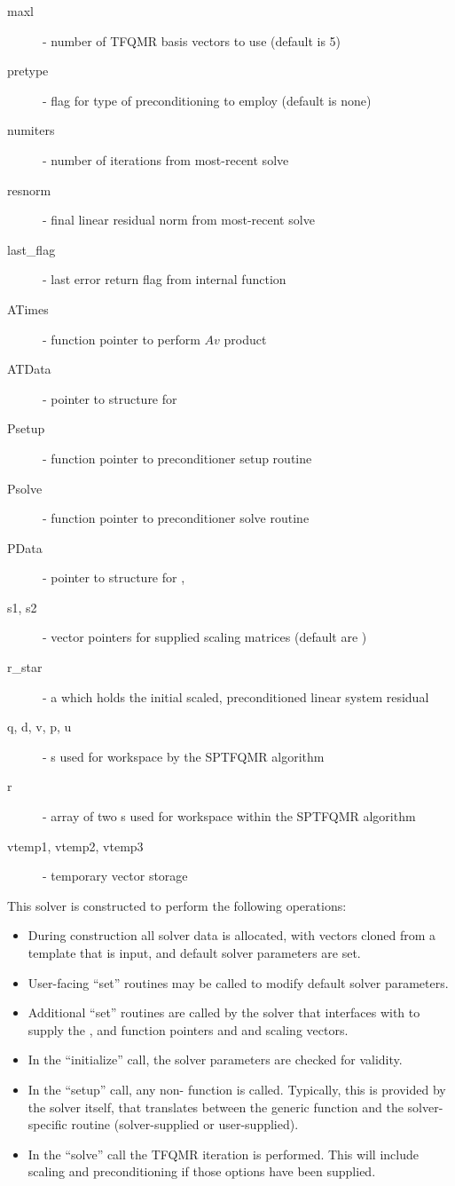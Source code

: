 \begin{description}
  \item[maxl] - number of TFQMR basis vectors to use (default is 5)
  \item[pretype] - flag for type of preconditioning to employ
    (default is none)
  \item[numiters] - number of iterations from most-recent solve
  \item[resnorm] - final linear residual norm from most-recent solve
  \item[last\_flag] - last error return flag from internal function
  \item[ATimes] - function pointer to perform $Av$ product
  \item[ATData] - pointer to structure for 
  \item[Psetup] - function pointer to preconditioner setup routine
  \item[Psolve] - function pointer to preconditioner solve routine
  \item[PData] - pointer to structure for , 
  \item[s1, s2] - vector pointers for supplied scaling matrices
    (default are )
  \item[r\_star] - a {\nvector} which holds the initial scaled,
    preconditioned linear system residual 
  \item[q, d, v, p, u] - {\nvector}s used for workspace by the SPTFQMR
    algorithm
  \item [r] - array of two {\nvector}s used for workspace within the
    SPTFQMR algorithm 
  \item[vtemp1, vtemp2, vtemp3] - temporary vector storage
\end{description}

This solver is constructed to perform the following operations:
\begin{itemize}
\item During construction all {\nvector} solver data is allocated,
  with vectors cloned from a template {\nvector} that is input, and
  default solver parameters are set.
\item User-facing ``set'' routines may be called to modify default
  solver parameters.
\item Additional ``set'' routines are called by the {\sundials} solver
  that interfaces with {\sunlinsolsptfqmr} to supply the 
  ,  and  function pointers and
   and  scaling vectors.
\item In the ``initialize'' call, the solver parameters are checked
  for validity.
\item In the ``setup'' call, any non- 
   function is called.  Typically, this is provided by
  the {\sundials} solver itself, that translates between the
  generic  function and the
  solver-specific routine (solver-supplied or user-supplied).
\item In the ``solve'' call the TFQMR iteration is performed.  This
  will include scaling and preconditioning if those options have been
  supplied.
\end{itemize}

